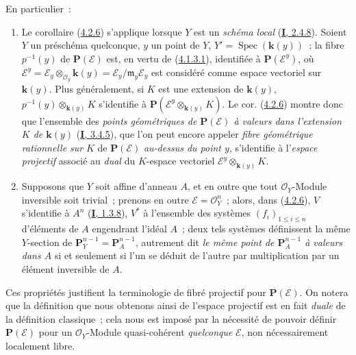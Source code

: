 
En particulier~:
\begin{enumerate}
  \item[1\textsuperscript{o}] Le corollaire
  (\hyperref[II.4.2.6-fr]{4.2.6}) s'applique lorsque $Y$ est un
  \emph{schéma local} (\hyperref[I.2.4.8-fr]{\textbf{I}, 2.4.8}). Soient $Y$ un
  préschéma quelconque, $y$ un point de $Y$,
  $Y'=\operatorname{Spec}(\boldsymbol{k}(y))$~; la fibre $p^{-1}(y)$ de
  $\mathbf{P}(\mathcal{E})$ est, en vertu de
  (\hyperref[II.4.1.3.1-fr]{4.1.3.1}), identifiée à
  $\mathbf{P}(\mathcal{E}^y)$, où
  $\mathcal{E}^y=\mathcal{E}_y\otimes_{\mathcal{O}_y}\boldsymbol{k}(y)
  =\mathcal{E}_y/\mathfrak{m}_y\mathcal{E}_y$ est considéré comme espace
  vectoriel sur $\boldsymbol{k}(y)$. Plus généralement, si $K$ est une extension de
  $\boldsymbol{k}(y)$, $p^{-1}(y)\otimes_{\boldsymbol{k}(y)}K$ s'identifie à
  $\mathbf{P}(\mathcal{E}^y\otimes_{\boldsymbol{k}(y)}K)$. Le cor.
  (\hyperref[II.4.2.6-fr]{4.2.6}) montre donc que l'ensemble des
  \emph{points géométriques de $\mathbf{P}(\mathcal{E})$ à valeurs dans
  l'extension $K$ de $\boldsymbol{k}(y)$} (\hyperref[I.3.4.5-fr]{\textbf{I}, 3.4.5}), que l'on
  peut encore appeler \emph{fibre géométrique rationnelle sur} $K$ de
  $\mathbf{P}(\mathcal{E})$ \emph{au-dessus du point $y$}, s'identifie à
  l'\emph{espace projectif} associé au \emph{dual} du $K$-espace vectoriel
  $\mathcal{E}^y\otimes_{\boldsymbol{k}(y)}K$.
  \item[2\textsuperscript{o}] Supposons que $Y$ soit affine d'anneau $A$, et
  en outre que tout $\mathcal{O}_Y$-Module inversible soit trivial~; prenons
  en outre $\mathcal{E}=\mathcal{O}_Y^n$~; alors, dans
  (\hyperref[II.4.2.6-fr]{4.2.6}), $V$ s'identifie à $A^n$
  (\hyperref[I.1.3.8-fr]{\textbf{I}, 1.3.8}), $V^*$ à l'ensemble des systèmes
  $(f_i)_{1\leq i\leq n}$ d'éléments de $A$ engendrant l'idéal $A$~; deux
  tels systèmes définissent la même $Y$-section de
  $\mathbf{P}_Y^{n-1}=\mathbf{P}_A^{n-1}$, autrement dit \emph{le même point de
  $\mathbf{P}_A^{n-1}$ à valeurs dans $A$} si et seulement si l'un se déduit
  de l'autre par multiplication par un élément inversible de $A$.
\end{enumerate}

Ces propriétés justifient la terminologie de \og fibré projectif\fg{} pour
$\mathbf{P}(\mathcal{E})$. On notera que la définition que nous obtenons
ainsi de l'\og espace projectif\fg{} est en fait \emph{duale} de la définition
classique~; cela nous est imposé par la nécessité de pouvoir définir
$\mathbf{P}(\mathcal{E})$ pour un $\mathcal{O}_Y$-Module quasi-cohérent
\emph{quelconque} $\mathcal{E}$, non nécessairement localement libre.

